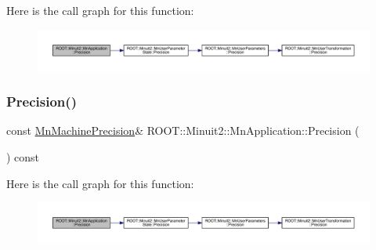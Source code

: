 Here is the call graph for this function\+:
\nopagebreak
\begin{figure}[H]
\begin{center}
\leavevmode
\includegraphics[width=350pt]{df/dd5/classROOT_1_1Minuit2_1_1MnApplication_a8de6eb3be52721cec183ba830504e7bc_cgraph}
\end{center}
\end{figure}
\mbox{\label{classROOT_1_1Minuit2_1_1MnApplication_a8de6eb3be52721cec183ba830504e7bc}} 
\subsubsection{\texorpdfstring{Precision()}{Precision()}\hspace{0.1cm}{\footnotesize\ttfamily [2/3]}}
{\footnotesize\ttfamily const \mbox{\hyperlink{classROOT_1_1Minuit2_1_1MnMachinePrecision}{Mn\+Machine\+Precision}}\& R\+O\+O\+T\+::\+Minuit2\+::\+Mn\+Application\+::\+Precision (\begin{DoxyParamCaption}{ }\end{DoxyParamCaption}) const\hspace{0.3cm}{\ttfamily [inline]}}

Here is the call graph for this function\+:
\nopagebreak
\begin{figure}[H]
\begin{center}
\leavevmode
\includegraphics[width=350pt]{df/dd5/classROOT_1_1Minuit2_1_1MnApplication_a8de6eb3be52721cec183ba830504e7bc_cgraph}
\end{center}
\end{figure}
\mbox{\label{classROOT_1_1Minuit2_1_1MnApplication_a8de6eb3be52721cec183ba830504e7bc}} 
